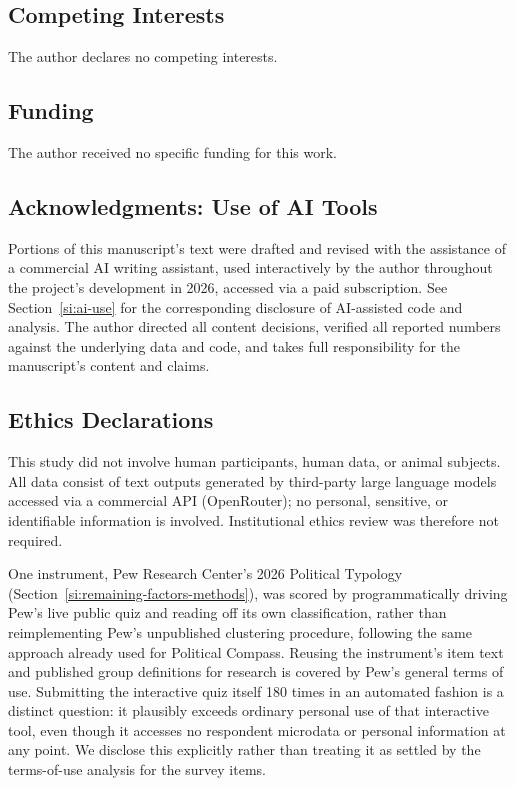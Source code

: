 \documentclass[11pt]{article}
\begin{document}
\subsection*{Competing Interests}
The author declares no competing interests.

\subsection*{Funding}
The author received no specific funding for this work.

\subsection*{Acknowledgments: Use of AI Tools}
Portions of this manuscript's text were drafted and revised with the
assistance of a commercial AI writing assistant, used interactively by the
author throughout the project's development in 2026, accessed via a paid
subscription. See Section~\ref{si:ai-use} for the corresponding disclosure
of AI-assisted code and analysis. The author directed all content
decisions, verified all reported numbers against the underlying data and
code, and takes full responsibility for the manuscript's content and
claims.

\subsection*{Ethics Declarations}
This study did not involve human participants, human data, or animal
subjects. All data consist of text outputs generated by third-party large
language models accessed via a commercial API (OpenRouter); no personal,
sensitive, or identifiable information is involved. Institutional ethics
review was therefore not required.

One instrument, Pew Research Center's 2026 Political Typology (Section~\ref{si:remaining-factors-methods}),
was scored by programmatically driving Pew's live public quiz and reading
off its own classification, rather than reimplementing Pew's unpublished
clustering procedure, following the same approach already used for
Political Compass. Reusing the instrument's item text and published group
definitions for research is covered by Pew's general terms of use.
Submitting the interactive quiz itself 180 times in an automated fashion is
a distinct question: it plausibly exceeds ordinary personal use of that
interactive tool, even though it accesses no respondent microdata or
personal information at any point. We disclose this explicitly rather than
treating it as settled by the terms-of-use analysis for the survey items.



\end{document}
